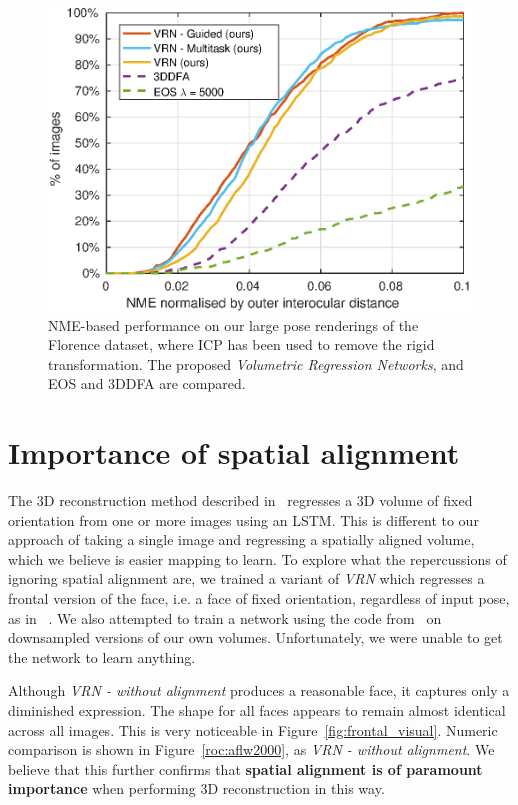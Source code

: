 \begin{figure}
  \centering
  \includegraphics[width=0.75\linewidth]{curves-icp/florence.eps}
  \caption[NME performance on Florence with ICP Alignment]{NME-based
    performance on our large pose renderings of the Florence dataset,
    where ICP has been used to remove the rigid transformation. The
    proposed \textit{Volumetric Regression Networks}, and EOS and
    3DDFA are compared.}
  \label{roc:florenceicp}
\end{figure}


\section{Importance of spatial alignment}
\label{sec:spatialimportance}

The 3D reconstruction method described in~\cite{choy20163d} regresses
a 3D volume of fixed orientation from one or more images using an
LSTM. This is different to our approach of taking a single image and
regressing a spatially aligned volume, which we believe is easier
mapping to learn. To explore what the repercussions of ignoring
spatial alignment are, we trained a variant of \textit{VRN} which
regresses a frontal version of the face, i.e. a face of fixed
orientation, regardless of input pose, as in ~\cite{choy20163d}. We
also attempted to train a network using the code
from~\cite{choy20163d} on downsampled versions of our own
volumes. Unfortunately, we were unable to get the network to learn
anything.

Although \textit{VRN - without alignment} produces a reasonable face,
it captures only a diminished expression. The shape for all faces
appears to remain almost identical across all images. This is very
noticeable in Figure~\ref{fig:frontal_visual}. Numeric comparison is
shown in Figure~\ref{roc:aflw2000}, as \textit{VRN - without
  alignment}. We believe that this further confirms that
\textbf{spatial alignment is of paramount importance} when performing
3D reconstruction in this way.

